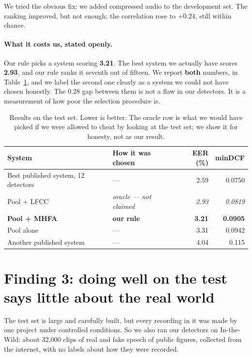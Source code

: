 \documentclass[11pt,a4paper]{article}
\newcommand{\best}[1]{\textbf{#1}}
\begin{document}
We tried the obvious fix: we added compressed audio to the development set. The ranking improved,
but not enough; the correlation rose to $+0.24$, still within chance.

\paragraph{What it costs us, stated openly.} Our rule picks a system scoring \best{3.21}. The best
system we actually have scores \textbf{2.93}, and our rule ranks it seventh out of fifteen. We report
\textbf{both} numbers, in Table~\ref{tab:plain_results}, and we label the second one clearly as a
system we could not have chosen honestly. The 0.28 gap between them is not a flaw in our detectors.
It is a measurement of how poor the selection procedure is.

\begin{table}[t]
\centering
\small
\caption{Results on the test set. Lower is better. The oracle row is what we would have picked if we
were allowed to cheat by looking at the test set; we show it for honesty, not as our result.}
\label{tab:plain_results}
\begin{tabular}{llrr}
\toprule
System & How it was chosen & EER (\%) & minDCF \\
\midrule
Best published system, 12 detectors \citep{ustc2024} & --- & 2.59 & 0.0750 \\
Pool + LFCC & \emph{oracle --- not claimed} & \emph{2.93} & \emph{0.0819} \\
\best{Pool + MHFA} & \best{our rule} & \best{3.21} & \best{0.0905} \\
Pool alone & --- & 3.31 & 0.0942 \\
Another published system \citep{szuafs} & --- & 4.04 & 0.115 \\
\bottomrule
\end{tabular}
\end{table}

\section{Finding 3: doing well on the test says little about the real world}

The test set is large and carefully built, but every recording in it was made by one project under
controlled conditions. So we also ran our detectors on In-the-Wild: about 32{,}000 clips of real and
fake speech of public figures, collected from the internet, with no labels about how they were
recorded.
\end{document}
